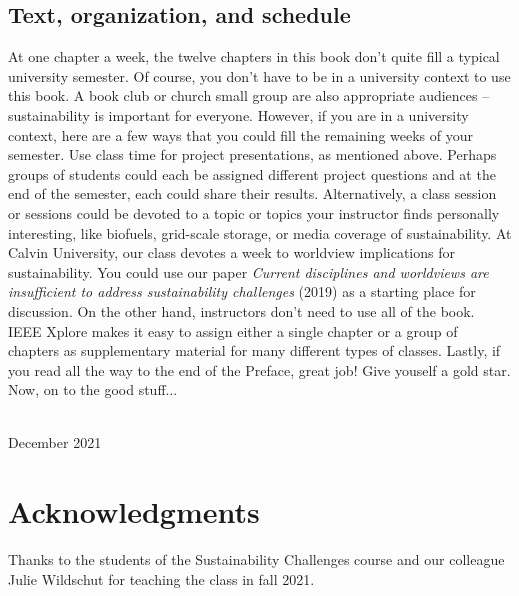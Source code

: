 {\section*{Text, organization, and schedule} At one chapter a week, the twelve chapters
in this book don't quite fill a typical university semester. Of course, you don't
have to be in a university context to use this book. A book club or church small group 
are also appropriate audiences -- sustainability is important for everyone. However,
if you are in a university context, here are a few ways that you could fill the 
remaining weeks of your semester. Use class time for project presentations, as
mentioned above. Perhaps groups of students could each be assigned different 
project questions and at the end of the semester, each could share their results.
Alternatively, a class session or sessions could be devoted to a topic or topics your instructor
finds personally interesting, like biofuels, grid-scale storage, or media coverage
of sustainability. At Calvin University, our class devotes a week to worldview
implications for sustainability. You could use our paper \emph{Current disciplines 
and worldviews are insufficient to address sustainability challenges} (2019) as a 
starting place for discussion. %
On the other hand, instructors don't need to use all of the book. IEEE Xplore
makes it easy to assign either a single chapter or a group of chapters as supplementary
material for many different types of classes.
Lastly, if you read all the way to the end of the Preface, great job! Give youself a 
gold star. Now, on to the good stuff...


\vspace*{2pc}
\noindent\AUTHORS\\
\noindent December 2021
}

\clearpage




\blankpage

\chapter*{Acknowledgments}
\thispagestyle{plain}

\noindent
Thanks to the students of the Sustainability Challenges course and our colleague 
Julie Wildschut for teaching the class in fall 2021.

